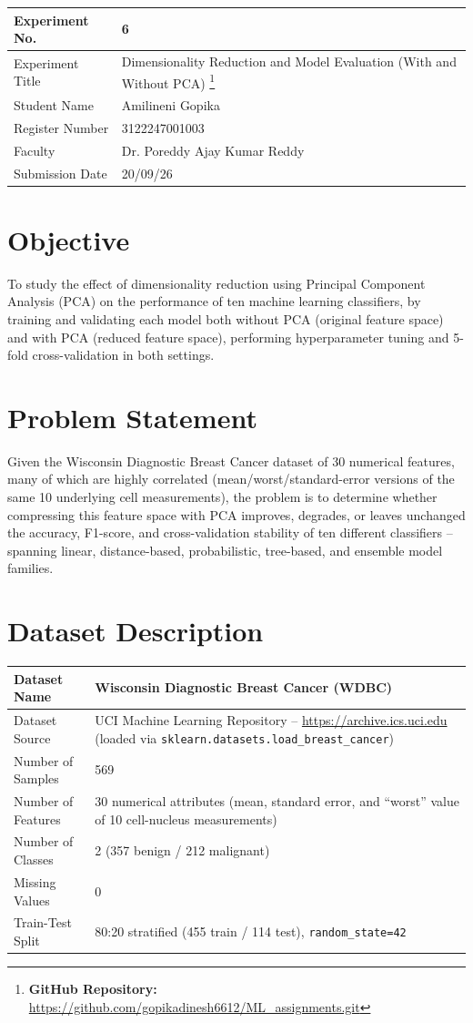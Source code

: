 \documentclass[12pt,a4paper]{article}
\begin{document}
\begin{tabular}{|p{4cm}|p{11cm}|}
\hline
Experiment No. & 6 \\ \hline
Experiment Title & Dimensionality Reduction and Model Evaluation (With and Without PCA)
\footnote{\textbf{GitHub Repository: }\url{https://github.com/gopikadinesh6612/ML_assignments.git}}\\ \hline
Student Name & Amilineni Gopika \\ \hline
Register Number & 3122247001003 \\ \hline
Faculty & Dr. Poreddy Ajay Kumar Reddy \\ \hline
Submission Date & 20/09/26 \\ \hline
\end{tabular}

\section{Objective}
To study the effect of dimensionality reduction using Principal Component Analysis (PCA) on
the performance of ten machine learning classifiers, by training and validating each model
both without PCA (original feature space) and with PCA (reduced feature space), performing
hyperparameter tuning and 5-fold cross-validation in both settings.

\section{Problem Statement}
Given the Wisconsin Diagnostic Breast Cancer dataset of 30 numerical features, many of which
are highly correlated (mean/worst/standard-error versions of the same 10 underlying cell
measurements), the problem is to determine whether compressing this feature space with PCA
improves, degrades, or leaves unchanged the accuracy, F1-score, and cross-validation
stability of ten different classifiers -- spanning linear, distance-based, probabilistic,
tree-based, and ensemble model families.

\section{Dataset Description}
\begin{longtable}{|p{6cm}|p{8cm}|}
\hline
Dataset Name & Wisconsin Diagnostic Breast Cancer (WDBC) \\ \hline
Dataset Source & UCI Machine Learning Repository -- \url{https://archive.ics.uci.edu} (loaded via \texttt{sklearn.datasets.load\_breast\_cancer}) \\ \hline
Number of Samples & 569 \\ \hline
Number of Features & 30 numerical attributes (mean, standard error, and ``worst'' value of 10 cell-nucleus measurements) \\ \hline
Number of Classes & 2 (357 benign / 212 malignant) \\ \hline
Missing Values & 0 \\ \hline
Train-Test Split & 80:20 stratified (455 train / 114 test), \texttt{random\_state=42} \\ \hline
\end{longtable}
\end{document}
